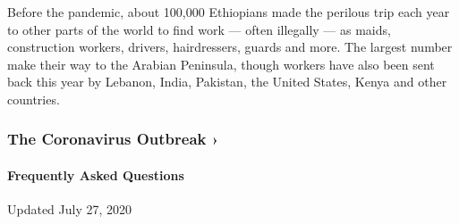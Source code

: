 Before the pandemic, about 100,000 Ethiopians made the perilous trip
each year to other parts of the world to find work --- often illegally
--- as maids, construction workers, drivers, hairdressers, guards and
more. The largest number make their way to the Arabian Peninsula, though
workers have also been sent back this year by Lebanon, India, Pakistan,
the United States, Kenya and other countries.

\href{https://www.nytimes.com/news-event/coronavirus?action=click\&pgtype=Article\&state=default\&region=MAIN_CONTENT_3\&context=storylines_faq}{}

\hypertarget{the-coronavirus-outbreak-}{%
\subsubsection{The Coronavirus Outbreak
›}\label{the-coronavirus-outbreak-}}

\hypertarget{frequently-asked-questions}{%
\paragraph{Frequently Asked
Questions}\label{frequently-asked-questions}}

Updated July 27, 2020

